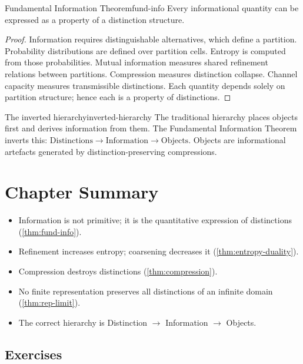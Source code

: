 \documentclass[12pt,twoside,openright]{book}
\newenvironment{chapsummary}{%
  \begin{tcolorbox}[colback=DistBlue!5,colframe=DistBlue,
    title={\faBookOpen\enspace Summary},
    fonttitle=\sffamily\bfseries\color{white},
    attach boxed title to top left={yshift=-2mm,xshift=4mm},
    boxed title style={colback=DistBlue,rounded corners}]
  \begin{itemize}[nosep,leftmargin=*]}{%
  \end{itemize}\end{tcolorbox}}
\begin{document}
\begin{theorem}{Fundamental Information Theorem}{fund-info}
  Every informational quantity can be expressed as a
  property of a distinction structure.
\end{theorem}

\begin{proof}
  Information requires distinguishable alternatives, which
  define a partition. Probability distributions are defined
  over partition cells. Entropy is computed from those
  probabilities. Mutual information measures shared
  refinement relations between partitions. Compression
  measures distinction collapse. Channel capacity measures
  transmissible distinctions. Each quantity depends solely
  on partition structure; hence each is a property of
  distinctions.
\end{proof}

\begin{remark}{The inverted hierarchy}{inverted-hierarchy}
  The traditional hierarchy places objects first and
  derives information from them. The Fundamental
  Information Theorem inverts this:
  $\text{Distinctions} \to \text{Information} \to \text{Objects}$.
  Objects are informational artefacts generated by
  distinction-preserving compressions.
\end{remark}

\section*{Chapter Summary}
\begin{chapsummary}
  \item Information is not primitive; it is the
        quantitative expression of distinctions
        (\cref{thm:fund-info}).
  \item Refinement increases entropy; coarsening decreases
        it (\cref{thm:entropy-duality}).
  \item Compression destroys distinctions
        (\cref{thm:compression}).
  \item No finite representation preserves all distinctions
        of an infinite domain (\cref{thm:rep-limit}).
  \item The correct hierarchy is Distinction $\to$
        Information $\to$ Objects.
\end{chapsummary}

\subsection*{Exercises}
\end{document}
